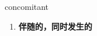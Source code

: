 
\begin{frame}
{\huge concomitant}
\begin{center}
\begin{enumerate}\Large
  \item \textbf{伴随的，同时发生的}
\end{enumerate}
\end{center}
\end{frame}
